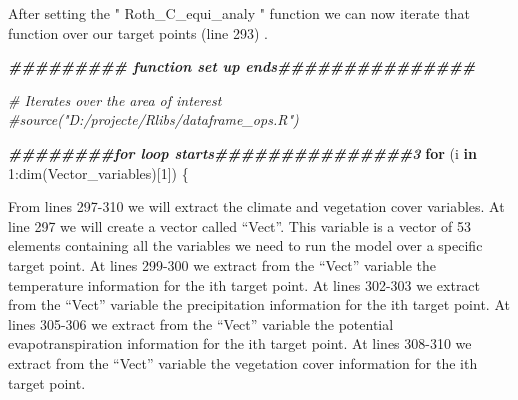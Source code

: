 \documentclass[
  10pt,
  b5paper,
]{book}
\newenvironment{Shaded}{\begin{snugshade}}{\end{snugshade}}
\newcommand{\CommentTok}[1]{\textcolor[rgb]{0.56,0.35,0.01}{\textit{#1}}}
\newcommand{\ControlFlowTok}[1]{\textcolor[rgb]{0.13,0.29,0.53}{\textbf{#1}}}
\newcommand{\DecValTok}[1]{\textcolor[rgb]{0.00,0.00,0.81}{#1}}
\newcommand{\DocumentationTok}[1]{\textcolor[rgb]{0.56,0.35,0.01}{\textbf{\textit{#1}}}}
\newcommand{\FunctionTok}[1]{\textcolor[rgb]{0.00,0.00,0.00}{#1}}
\newcommand{\NormalTok}[1]{#1}
\newcommand{\SpecialCharTok}[1]{\textcolor[rgb]{0.00,0.00,0.00}{#1}}
\begin{document}
After setting the " Roth\_C\_equi\_analy " function we can now iterate that function over our target points (line 293) .

\begin{Shaded}
\begin{Highlighting}[]
\DocumentationTok{\#\#\#\#\#\#\#\#\# function set up ends\#\#\#\#\#\#\#\#\#\#\#\#\#\#\#}

\CommentTok{\# Iterates over the area of interest}
\CommentTok{\#source("D:/projecte/Rlibs/dataframe\_ops.R")}

\DocumentationTok{\#\#\#\#\#\#\#\#for loop starts\#\#\#\#\#\#\#\#\#\#\#\#\#\#\#3}
\ControlFlowTok{for}\NormalTok{ (i }\ControlFlowTok{in} \DecValTok{1}\SpecialCharTok{:}\FunctionTok{dim}\NormalTok{(Vector\_variables)[}\DecValTok{1}\NormalTok{]) \{}
\end{Highlighting}
\end{Shaded}

From lines 297-310 we will extract the climate and vegetation cover variables. At line 297 we will create a vector called ``Vect''. This variable is a vector of 53 elements containing all the variables we need to run the model over a specific target point. At lines 299-300 we extract from the ``Vect'' variable the temperature information for the ith target point. At lines 302-303 we extract from the ``Vect'' variable the precipitation information for the ith target point. At lines 305-306 we extract from the ``Vect'' variable the potential evapotranspiration information for the ith target point. At lines 308-310 we extract from the ``Vect'' variable the vegetation cover information for the ith target point.
\end{document}
